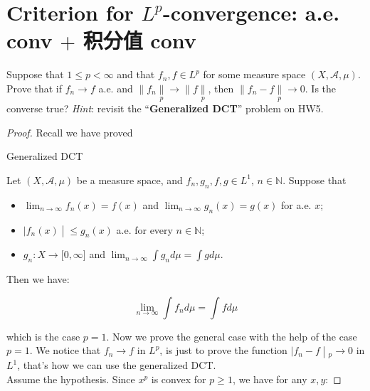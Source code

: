 \documentclass{qlnotes-export}
\begin{document}
\section{\texorpdfstring{Criterion for \(L^{p}\)-convergence: a.e. conv \(+\) 积分值 conv}{Criterion for L\^{}\{p\}-convergence: a.e. conv + 积分值 conv}}

Suppose that \(1 \leq p < \infty\) and that \(f_{n},f \in L^{p}\) for some measure space \((X,\mathcal{A},\mu)\). Prove that if \(f_{n}\rightarrow f\) a.e. and \(\parallel f_{n}\underset{p}{\parallel}\rightarrow \parallel f\underset{p}{\parallel}\), then \(\parallel f_{n} - f\underset{p}{\parallel}\rightarrow 0\). Is the converse true? \emph{Hint}: revisit the ``\textbf{Generalized DCT}'' problem on HW5.

\begin{proof}

Recall we have proved

\begin{theorem}{Generalized DCT}\label{thm-hw08-on-l-p-spacecs-generalized-dct}

Let \((X,\mathcal{A},\mu)\) be a measure space, and \(f_{n},g_{n},f,g \in L^{1}\), \(n \in {\mathbb{N}}\). Suppose that

\begin{itemize}
\item
  \(\lim_{n\rightarrow\infty}f_{n}(x) = f(x)\) and \(\lim_{n\rightarrow\infty}g_{n}(x) = g(x)\) for a.e. \(x\);
\item
  \(\left. |f_{n}(x) \middle| \leq g_{n}(x) \right.\) a.e. for every \(n \in {\mathbb{N}}\);
\item
  \(g_{n}:X\rightarrow\lbrack 0,\infty\rbrack\) and \(\lim_{n\rightarrow\infty}\int g_{n} d\mu = \int g d\mu\).
\end{itemize}

Then we have:

\[\lim\limits_{n\rightarrow\infty}\int f_{n} d\mu = \int f d\mu\]

\end{theorem}

which is the case \(p = 1\). Now we prove the general case with the help of the case \(p = 1\). We notice that \(f_{n}\rightarrow f\) in \(L^{p}\), is just to prove the function \(\left. |f_{n} - f \middle| {}_{p}\rightarrow 0 \right.\) in \(L^{1}\), that's how we can use the generalized DCT.\\
Assume the hypothesis. Since \(x^{p}\) is convex for \(p \geq 1\), we have for any \(x,y\):


\end{proof}
\end{document}
